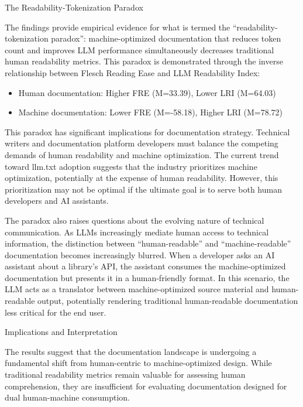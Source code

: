 \documentclass[10pt,conference,a4paper]{IEEEtran}
\makeatletter
\let\oldsubsection\subsection
\renewcommand{\subsection}{%
    \@ifstar{\subsectionStar}{\subsectionNoStar}%
}
\newcommand{\subsectionStar}[1]{%
    \oldsubsection*{\textit{#1}}%
    \vspace{-3pt}%
}
\newcommand{\subsectionNoStar}[1]{%
    \oldsubsection{\textit{#1}}%
    \vspace{-3pt}%
}
\makeatother
\begin{document}
\subsection{The Readability-Tokenization Paradox}

The findings provide empirical evidence for what is termed the ``readability-tokenization paradox'': machine-optimized documentation that reduces token count and improves LLM performance simultaneously decreases traditional human readability metrics. This paradox is demonstrated through the inverse relationship between Flesch Reading Ease and LLM Readability Index:

\begin{itemize}
    \item Human documentation: Higher FRE (M=33.39), Lower LRI (M=64.03)
    \item Machine documentation: Lower FRE (M=-58.18), Higher LRI (M=78.72)
\end{itemize}

This paradox has significant implications for documentation strategy. Technical writers and documentation platform developers must balance the competing demands of human readability and machine optimization. The current trend toward llm.txt adoption suggests that the industry prioritizes machine optimization, potentially at the expense of human readability. However, this prioritization may not be optimal if the ultimate goal is to serve both human developers and AI assistants.

The paradox also raises questions about the evolving nature of technical communication. As LLMs increasingly mediate human access to technical information, the distinction between ``human-readable'' and ``machine-readable'' documentation becomes increasingly blurred. When a developer asks an AI assistant about a library's API, the assistant consumes the machine-optimized documentation but presents it in a human-friendly format. In this scenario, the LLM acts as a translator between machine-optimized source material and human-readable output, potentially rendering traditional human-readable documentation less critical for the end user.

\subsection{Implications and Interpretation}

The results suggest that the documentation landscape is undergoing a fundamental shift from human-centric to machine-optimized design. While traditional readability metrics remain valuable for assessing human comprehension, they are insufficient for evaluating documentation designed for dual human-machine consumption.
\end{document}
